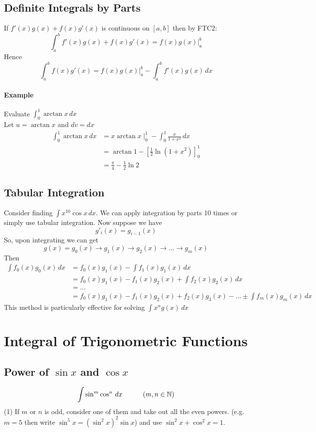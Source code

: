 \documentclass[12pt]{article}
\newcommand\tab[1][1cm]{\hspace*{#1}}
\begin{document}
\subsection{Definite Integrals by Parts}
If $f'(x)g(x) + f(x)g'(x)$ is continuous on $[a, b]$ then by FTC2:
\[
    \int_a^b f'(x)g(x) + f(x)g'(x) = f(x)g(x) |_a^b 
\]
Hence 
\[
    \int_a^b f(x)g'(x) = f(x)g(x) |_a^b - \int_a^b f'(x)g(x) \, dx
\]

\paragraph{Example} Evaluate $\int_0^1 \arctan x \, dx$ \\
Let $u = \arctan x$ and $dv = dx$
\begin{align*} 
    \int_0^1 \arctan x \, dx &= x\arctan x \mid_0^1 - \int_0^1 \frac{x}{1 + x^2} \, dx \\
    &= \arctan 1 - \left[ \frac{1}{2} \ln (1 + x^2) \right]_0^1 \\
    &= \frac{\pi}{4} - \frac{1}{2}\ln 2
\end{align*}
    
\subsection{Tabular Integration}
Consider finding $\int x^{10} \cos x \, dx$. We can apply integration by parts 10 times or simply use tabular integration.
Now suppose we have
\[
    g'_i (x) = g_{i - 1}(x)
\]
So, upon integrating we can get
\[
    g(x) = g_0(x) \to g_1(x) \to g_2(x) \to \dots  \to g_m(x)
\]
Then 
\begin{align*} 
    \int f_0(x)g_0(x) \, dx &= f_0(x)g_1(x) - \int f_1(x)g_1(x) \, dx \\
    &= f_0(x)g_1(x) - f_1(x)g_2(x) + \int f_2(x)g_2(x) \, dx \\
    &= \dots \\
    &= f_0(x)g_1(x) - f_1(x)g_2(x) + f_2(x)g_3(x) - \dots \pm \int f_m(x)g_m(x) \, dx
\end{align*}
This method is particularly effective for solving $\int x^n g(x) \, dx$

\section{Integral of Trigonometric Functions}
\subsection{Power of $\sin x$ and $\cos x$}
\[
    \int \sin^m \cos^n \, dx\, \textrm{\tab} (m, n \in \mathbb{N})
\]
\noindent
(1) If $m$ or $n$ is odd, consider one of them and take out all the even powers.
(e.g. $m = 5$ then write $\sin^5 x = (\sin^2 x)^2 \sin x$) and use $\sin^2 x + \cos^2 x = 1$.
\end{document}

